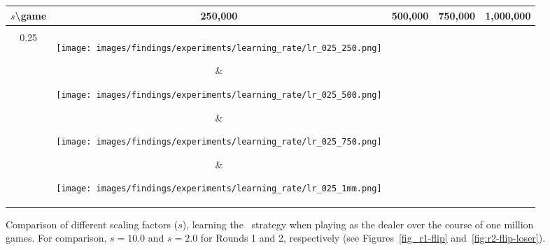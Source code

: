 \begin{figure}[h]
	\centering

	\begin{tabular}{c | c c c c}
		$s$\textbackslash game & 250,000 & 500,000 & 750,000 & 1,000,000 \\
		\hline
		\\
		0.25 & %
			\parbox[c]{5em}{\texttt{[image: images/findings/experiments/learning\_rate/lr\_025\_250.png]}} & %
			\parbox[c]{5em}{\texttt{[image: images/findings/experiments/learning\_rate/lr\_025\_500.png]}} & %
			\parbox[c]{5em}{\texttt{[image: images/findings/experiments/learning\_rate/lr\_025\_750.png]}} & %
			\parbox[c]{5em}{\texttt{[image: images/findings/experiments/learning\_rate/lr\_025\_1mm.png]}} \\ %
		\\
		0.50 & 
			\parbox[c]{5em}{\texttt{[image: images/findings/experiments/learning\_rate/lr\_050\_250.png]}} & %
			\parbox[c]{5em}{\texttt{[image: images/findings/experiments/learning\_rate/lr\_050\_500.png]}} & %
			\parbox[c]{5em}{\texttt{[image: images/findings/experiments/learning\_rate/lr\_050\_750.png]}} & %
			\parbox[c]{5em}{\texttt{[image: images/findings/experiments/learning\_rate/lr\_050\_1mm.png]}} \\ %
		\\
		1.00 & 
			\parbox[c]{5em}{\texttt{[image: images/findings/experiments/learning\_rate/lr\_100\_250.png]}} & %
			\parbox[c]{5em}{\texttt{[image: images/findings/experiments/learning\_rate/lr\_100\_500.png]}} & %
			\parbox[c]{5em}{\texttt{[image: images/findings/experiments/learning\_rate/lr\_100\_750.png]}} & %
			\parbox[c]{5em}{\texttt{[image: images/findings/experiments/learning\_rate/lr\_100\_1mm.png]}} \\ %
		\\
		1.50 & 
			\parbox[c]{5em}{\texttt{[image: images/findings/experiments/learning\_rate/lr\_150\_250.png]}} & %
			\parbox[c]{5em}{\texttt{[image: images/findings/experiments/learning\_rate/lr\_150\_500.png]}} & %
			\parbox[c]{5em}{\texttt{[image: images/findings/experiments/learning\_rate/lr\_150\_750.png]}} & %
			\parbox[c]{5em}{\texttt{[image: images/findings/experiments/learning\_rate/lr\_150\_1mm.png]}} \\ %
	\end{tabular}

\caption{
	Comparison of different scaling factors ($s$),
	learning the \handmaxavg\ strategy
	when playing as the dealer
	over the course of one million games.
	For comparison, $s = 10.0$ and $s = 2.0$ for Rounds 1 and 2, respectively
	(see Figures~\ref{fig_r1-flip} and~\ref{fig:r2-flip-loser}).
	}
\label{fig:expts-lr-comp}
\end{figure}

